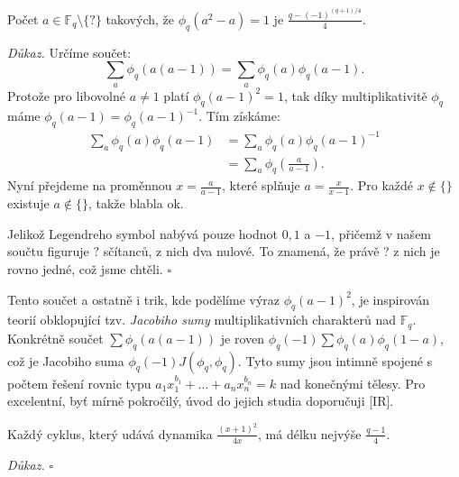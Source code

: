 \documentclass[12pt]{report}
\begin{document}

\begin{veta}
Počet $a \in \mathbb{F}_q \setminus \lbrace ? \rbrace$ takových, že $\phi_q ( a^2-a) = 1$ je $\frac{q-(-1)^{(q+1)/4}}{4}$.
\end{veta}
\noindent \textit{Důkaz.} Určíme součet:
$$\sum_{a} \phi_q (a (a-1)) = \sum_{a} \phi_q (a) \phi_q (a-1).$$
Protože pro libovolné $a \neq 1$ platí $\phi_q (a-1) ^2 = 1$, tak díky multiplikativitě $\phi_q$ máme $\phi_q (a-1) = \phi_q (a-1)^{-1}$. Tím získáme:
\begin{align*}
\sum_{a} \phi_q (a) \phi_q (a-1) &=  \sum_{a} \phi_q (a) \phi_q (a-1)^{-1}\\
&= \sum_{a} \phi_q \left (\frac{a}{a-1} \right).
\end{align*}
Nyní přejdeme na proměnnou $x = \frac{a}{a-1}$, které splňuje $a = \frac{x}{x-1}$. Pro každé $x \not\in \lbrace \rbrace$ existuje $a \not\in \lbrace \rbrace$, takže blabla ok.

Jelikož Legendreho symbol nabývá pouze hodnot $0,1$ a $-1$, přičemž v našem součtu figuruje $?$ sčítanců, z nich dva nulové. To znamená, že právě ? z nich je rovno jedné, což jsme chtěli. \hfill $\square$\\

\begin{poznamka}
Tento součet a ostatně i trik, kde podělíme výraz $\phi_q (a-1)^2$, je inspirován teorií obklopující tzv. \textit{Jacobiho sumy} multiplikativních charakterů nad $\mathbb{F}_q$. Konkrétně součet $\sum \phi_q (a(a-1))$ je roven $\phi_q (-1) \sum \phi_q (a) \phi_q (1-a)$, což je Jacobiho suma $\phi_q (-1) J(\phi_q, \phi_q)$. Tyto sumy jsou intimně spojené s počtem řešení rovnic typu $a_1 x_1 ^{b_1} + \dots + a_n x_n ^{b_n} = k$ nad konečnými tělesy. Pro excelentní, byť mírně pokročilý, úvod do jejich studia doporučuji [IR]. 
\end{poznamka}

\begin{dusledek}
Každý cyklus, který udává dynamika $\frac{(x+1)^2}{4x}$, má délku nejvýše $\frac{q-1}{4}$.
\end{dusledek}

\noindent \textit{Důkaz.}
\hfill $\square$
\end{document}
